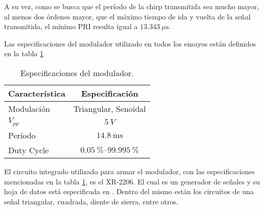 A su vez, como se busca que el período de la chirp transmitida sea mucho mayor, al menos dos órdenes mayor, que el máximo tiempo de ida y vuelta de la señal transmitida, el mínimo PRI resulta igual a $\SI{13.343}{\mu\second}$. 

Las especificaciones del modulador utilizado en todos los ensayos están definidos en la tabla \ref{tab:modulatorsSpecification}

\begin{table}[htb]
  \caption{Especificaciones del modulador.}
  \centering
  \label{tab:modulatorsSpecification}
  \begin{tabular}{l c}
  \toprule
  \textbf{Característica} & \textbf{Especificación} \tabularnewline
  \midrule

  Modulación & Triangular, Senoidal \tabularnewline

  $V_{pp}$ & $\SI{5}{V}$ \tabularnewline

  Período & $\SI{14.8}{\milli\second}$ \tabularnewline

  Duty Cycle & $\SIrange[range-phrase = \rightarrow]{0.05}{99.995}{\percent}$ \tabularnewline

  \bottomrule
  \end{tabular}
\end{table}

El circuito integrado utilizado para armar el modulador, con las especificaciones mencionadas en la tabla \ref{tab:modulatorsSpecification}, es el XR-2206. El cual es un generador de señales y su hoja de datos está especificada en \cite{Generator1972}. Dentro del mismo están los circuitos de una señal triangular, cuadrada, diente de sierra, entre otros.

